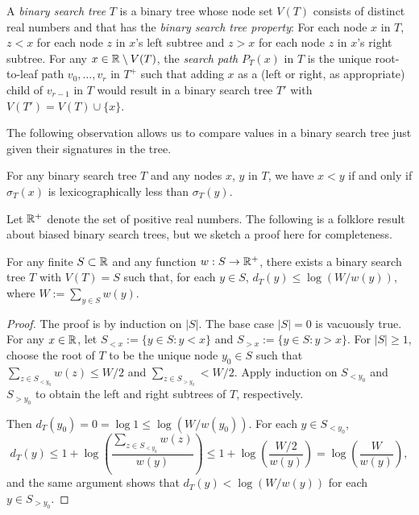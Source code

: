 \documentclass[kpfonts]{patmorin}
\let\le\leqslant
\let\ge\geqslant
\begin{document}
A \emph{binary search tree} $T$ is a binary tree whose node set $V(T)$ consists of distinct real numbers and that has the \emph{binary search tree property}:  For each node $x$ in $T$, $z<x$ for each node $z$ in $x$'s left subtree and $z>x$ for each node $z$ in $x$'s right subtree. For any $x\in\mathbb{R}\setminus V(T)$, the \emph{search path} $P_T(x)$ in $T$ is the unique root-to-leaf path $v_0,\dots,v_r$ in $T^+$ such that adding $x$ as a (left or right, as appropriate) child of $v_{r-1}$ in $T$ would result in a binary search tree $T'$ with $V(T')=V(T)\cup\{x\}$.

The following observation allows us to compare values in a binary search tree just given their signatures in the tree.

\begin{obs}
  For any binary search tree $T$ and any nodes $x$, $y$ in $T$, we have $x<y$ if and only if $\sigma_T(x)$ is lexicographically less than $\sigma_T(y)$.
\end{obs}

Let $\mathbb{R}^+$ denote the set of positive real numbers. The following is a folklore result about biased binary search trees, but we sketch a proof here for completeness.

\begin{lem}
  For any finite $S\subset \mathbb{R}$ and any function $w:S\to\mathbb{R}^+$, there exists a binary search tree $T$ with $V(T)=S$ such that, for each $y\in S$, $d_T(y)\le\log(W/w(y))$, where $W:=\sum_{y\in S} w(y)$.
\end{lem}

\begin{proof}
  The proof is by induction on $|S|$. The base case $|S|=0$ is vacuously true.
  For any $x\in\mathbb{R}$, let $S_{<x}:=\{y\in S: y < x\}$ and $S_{>x}:=\{y\in S: y>x\}$. For $|S|\ge 1$, choose the root of $T$ to be the unique node $y_0\in S$ such that $\sum_{z\in S_{<y_0}} w(z)\le W/2$ and $\sum_{z\in S_{>y_0}}< W/2$. Apply induction on $S_{<y_0}$ and $S_{>y_0}$ to obtain the left and right subtrees of $T$, respectively.

  Then $d_T(y_0)=0=\log 1\le \log (W/w(y_0))$.  For each $y\in S_{<y_0}$,
  \[
    d_T(y) \le 1 + \log\left(\frac{\sum_{z\in S_{<y_0}}w(z)}{w(y)}\right)
            \le 1 + \log \left(\frac{W/2}{w(y)}\right)
            = \log \left(\frac{W}{w(y)}\right) ,
  \]
  and the same argument shows that $d_T(y) < \log (W/w(y))$ for each $y\in S_{>y_0}$.
\end{proof}
\end{document}
